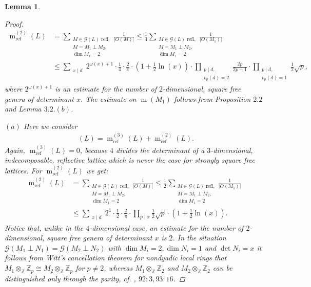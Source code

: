 \documentclass{amsart}
\newtheorem{lem}[thm]{Lemma}
\theoremstyle{definition}
\theoremstyle{remark}
\def\ZZ{\mathbb{Z}}
\def\CG{{\mathcal G}}
\def\CG{{\mathcal G}}
\DeclareMathOperator{\m}{m}
\DeclareMathOperator{\mref}{m_{ref}}
\DeclareMathOperator{\M}{M}
\begin{document}
\begin{lem}
\begin{proof}
   \begin{align*}
    \m^{(2)}_{\mathrm{ref}}(L) &= \sum_{\substack{\text{$M \in \CG(L)$ refl,} \\M = M_1 \perp M_2,\\ \dim M_1=2}} \frac{1}{|O(M)|} 
                               \leq \frac{1}{4} \sum_{\substack{\text{$M \in \CG(L)$ refl,} \\M = M_1 \perp M_2,\\ \dim M_1=2}} \frac{1}{|O(M_1)|} \\                       
                               &\leq \sum_{\substack{x \mid d}} 2^{\omega(x)+1} \cdot \frac{1}{4} \cdot \frac{2}{\pi} 
                                \cdot  \left(1+\frac{1}{2}\ln(x)\right)
                                \cdot \prod_{\substack{p \mid d,\\v_p(d)=2}}\frac{2p}{2p-1} \cdot \prod_{\substack{p \mid d,\\v_p(d)=1}}\frac{1}{2}\sqrt{p},
   \end{align*}
   where $2^{\omega(x)+1}$ is an estimate for the number of $2$-dimensional, square free genera of determinant $x$. The estimate on $\m(M_1)$ follows from Proposition $2.2$ and Lemma $3.2. (b)$.

  $(a)$ Here we consider 
   \begin{align*}
    \mref(L) = \m^{(3)}_{\mathrm{ref}}(L) + \m^{(2)}_{\mathrm{ref}}(L).
   \end{align*}
  Again, $\m^{(3)}_{\mathrm{ref}}(L) = 0$, because $4$ divides the determinant of a $3$-dimensional, indecomposable, reflective lattice which is never the case for strongly square free lattices.
  For $\m^{(2)}_{\mathrm{ref}}(L)$ we get:
  \begin{align*}
   \m^{(2)}_{\mathrm{ref}}(L) &= \sum_{\substack{\text{$M \in \CG(L)$ refl,} \\M = M_1 \perp M_2,\\ \dim M_1=2}} \frac{1}{|O(M)|} 
                              \leq \frac{1}{2} \sum_{\substack{\text{$M \in \CG(L)$ refl,} \\M = M_1 \perp M_2,\\ \dim M_1=2}} \frac{1}{|O(M_1)|} \\                            
                              &\leq \sum_{\substack{x \mid d}} 2^1 \cdot \frac{1}{2} \cdot \frac{2}{\pi} \cdot \prod_{p \mid x}\frac{1}{2}\sqrt{p} \cdot \left(1+\frac{1}{2}\ln(x)\right).
  \end{align*}
  Notice that, unlike in the $4$-dimensional case, an estimate for the number of $2$-dimensional, square free genera of determinant $x$ is $2$.
  In the situation $\CG(M_1 \perp N_1) = \CG(M_2 \perp N_2)$ with $\dim M_i =2, \dim N_i=1$ and $\det N_i = x$ it follows from Witt's cancellation theorem for nondyadic local rings that
  $M_1 \otimes_{\ZZ} \ZZ_p \cong M_2 \otimes_{\ZZ} \ZZ_p$ for $p \neq 2$, whereas $M_1 \otimes_{\ZZ} \ZZ_2$ and $M_2 \otimes_{\ZZ} \ZZ_2$ can be distinguished only through the parity, 
  cf. \cite{oma00}, $92:3, 93:16$.
 \end{proof}
\end{lem}
\end{document}
